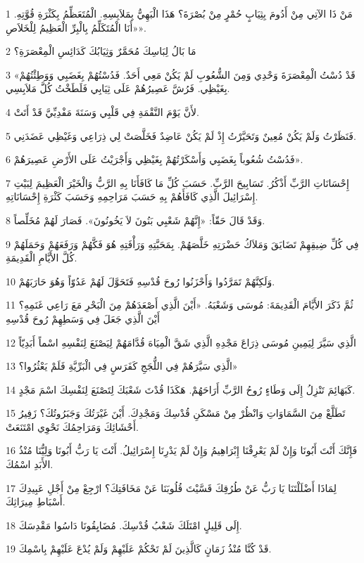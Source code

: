 \par 1 مَنْ ذَا الآتِي مِنْ أَدُومَ بِثِيَابٍ حُمْرٍ مِنْ بُصْرَةَ؟ هَذَا الْبَهِيُّ بِمَلاَبِسِهِ. الْمُتَعَظِّمُ بِكَثْرَةِ قُوَّتِهِ. «أَنَا الْمُتَكَلِّمُ بِالْبِرِّ الْعَظِيمُ لِلْخَلاَصِ».
\par 2 مَا بَالُ لِبَاسِكَ مُحَمَّرٌ وَثِيَابُكَ كَدَائِسِ الْمِعْصَرَةِ؟
\par 3 «قَدْ دُسْتُ الْمِعْصَرَةَ وَحْدِي وَمِنَ الشُّعُوبِ لَمْ يَكُنْ مَعِي أَحَدٌ. فَدُسْتُهُمْ بِغَضَبِي وَوَطِئْتُهُمْ بِغَيْظِي. فَرُشَّ عَصِيرُهُمْ عَلَى ثِيَابِي فَلَطَخْتُ كُلَّ مَلاَبِسِي.
\par 4 لأَنَّ يَوْمَ النَّقْمَةِ فِي قَلْبِي وَسَنَةَ مَفْدِيِّيَّ قَدْ أَتَتْ.
\par 5 فَنَظَرْتُ وَلَمْ يَكُنْ مُعِينٌ وَتَحَيَّرْتُ إِذْ لَمْ يَكُنْ عَاضِدٌ فَخَلَّصَتْ لِي ذِرَاعِي وَغَيْظِي عَضَدَنِي.
\par 6 فَدُسْتُ شُعُوباً بِغَضَبِي وَأَسْكَرْتُهُمْ بِغَيْظِي وَأَجْرَيْتُ عَلَى الأَرْضِ عَصِيرَهُمْ».
\par 7 إِحْسَانَاتِ الرَّبِّ أَذْكُرُ. تَسَابِيحَ الرَّبِّ. حَسَبَ كُلِّ مَا كَافَأَنَا بِهِ الرَّبُّ وَالْخَيْرَ الْعَظِيمَ لِبَيْتِ إِسْرَائِيلَ الَّذِي كَافَأَهُمْ بِهِ حَسَبَ مَرَاحِمِهِ وَحَسَبَ كَثْرَةِ إِحْسَانَاتِهِ.
\par 8 وَقَدْ قَالَ حَقّاً: «إِنَّهُمْ شَعْبِي بَنُونَ لاَ يَخُونُونَ». فَصَارَ لَهُمْ مُخَلِّصاً.
\par 9 فِي كُلِّ ضِيقِهِمْ تَضَايَقَ وَمَلاَكُ حَضْرَتِهِ خَلَّصَهُمْ. بِمَحَبَّتِهِ وَرَأْفَتِهِ هُوَ فَكَّهُمْ وَرَفَعَهُمْ وَحَمَلَهُمْ كُلَّ الأَيَّامِ الْقَدِيمَةِ.
\par 10 وَلَكِنَّهُمْ تَمَرَّدُوا وَأَحْزَنُوا رُوحَ قُدْسِهِ فَتَحَوَّلَ لَهُمْ عَدُوّاً وَهُوَ حَارَبَهُمْ.
\par 11 ثُمَّ ذَكَرَ الأَيَّامَ الْقَدِيمَةَ: مُوسَى وَشَعْبَهُ. «أَيْنَ الَّذِي أَصْعَدَهُمْ مِنَ الْبَحْرِ مَعَ رَاعِي غَنَمِهِ؟ أَيْنَ الَّذِي جَعَلَ فِي وَسَطِهِمْ رُوحَ قُدْسِهِ
\par 12 الَّذِي سَيَّرَ لِيَمِينِ مُوسَى ذِرَاعَ مَجْدِهِ الَّذِي شَقَّ الْمِيَاهَ قُدَّامَهُمْ لِيَصْنَعَ لِنَفْسِهِ اسْماً أَبَدِيّاً
\par 13 الَّذِي سَيَّرَهُمْ فِي اللُّجَجِ كَفَرَسٍ فِي الْبَرِّيَّةِ فَلَمْ يَعْثُرُوا؟»
\par 14 كَبَهَائِمَ تَنْزِلُ إِلَى وَطَاءٍ رُوحُ الرَّبِّ أَرَاحَهُمْ. هَكَذَا قُدْتَ شَعْبَكَ لِتَصْنَعَ لِنَفْسِكَ اسْمَ مَجْدٍ.
\par 15 تَطَلَّعْ مِنَ السَّمَاوَاتِ وَانْظُرْ مِنْ مَسْكَنِ قُدْسِكَ وَمَجْدِكَ. أَيْنَ غَيْرَتُكَ وَجَبَرُوتُكَ؟ زَفِيرُ أَحْشَائِكَ وَمَرَاحِمُكَ نَحْوِي امْتَنَعَتْ.
\par 16 فَإِنَّكَ أَنْتَ أَبُونَا وَإِنْ لَمْ يَعْرِفْنَا إِبْرَاهِيمُ وَإِنْ لَمْ يَدْرِنَا إِسْرَائِيلُ. أَنْتَ يَا رَبُّ أَبُونَا وَلِيُّنَا مُنْذُ الأَبَدِ اسْمُكَ.
\par 17 لِمَاذَا أَضْلَلْتَنَا يَا رَبُّ عَنْ طُرُقِكَ قَسَّيْتَ قُلُوبَنَا عَنْ مَخَافَتِكَ؟ ارْجِعْ مِنْ أَجْلِ عَبِيدِكَ أَسْبَاطِ مِيرَاثِكَ.
\par 18 إِلَى قَلِيلٍ امْتَلَكَ شَعْبُ قُدْسِكَ. مُضَايِقُونَا دَاسُوا مَقْدِسَكَ.
\par 19 قَدْ كُنَّا مُنْذُ زَمَانٍ كَالَّذِينَ لَمْ تَحْكُمْ عَلَيْهِمْ وَلَمْ يُدْعَ عَلَيْهِمْ بِاسْمِكَ.

